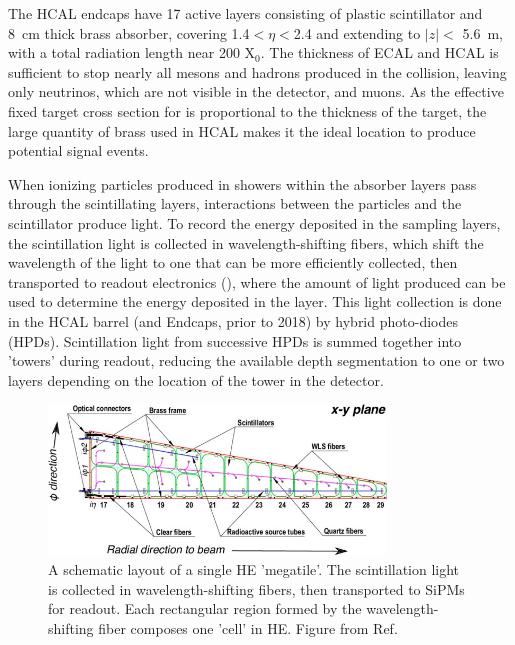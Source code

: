 The HCAL endcaps have 17 active layers consisting of plastic scintillator and \SI{8}{\centi\meter} thick brass absorber, covering 1.4$<\eta<$2.4 and extending to $\lvert z \rvert<$ \SI{5.6}{\meter}, with a total radiation length near 200 X$_0$. 
The thickness of ECAL and HCAL is sufficient to stop nearly all mesons and hadrons produced in the collision, leaving only neutrinos, which are not visible in the detector, and muons. 
As the effective fixed target cross section for \dbrem is proportional to the thickness of the target, the large quantity of brass used in HCAL makes it the ideal location to produce potential signal events.

When ionizing particles produced in showers within the absorber layers pass through the scintillating layers, interactions between the particles and the scintillator produce light.
To record the energy deposited in the sampling layers, the scintillation light is collected in wavelength-shifting fibers, which shift the wavelength of the light to one that can be more efficiently collected, then transported to readout electronics (), where the amount of light produced can be used to determine the energy deposited in the layer.
This light collection is done in the HCAL barrel (and Endcaps, prior to 2018) by hybrid photo-diodes (HPDs). 
Scintillation light from successive HPDs is summed together into 'towers' during readout, reducing the available depth segmentation to one or two layers depending on the location of the tower in the detector.

\begin{figure}[!htpb]
	   \centering
	      \includegraphics[width=0.8\textwidth]{figures/megatile.jpg}
		 \caption[An HCAL Tile]{A schematic layout of a single HE 'megatile'. The scintillation light is collected in wavelength-shifting fibers, then transported to SiPMs for readout. Each rectangular region formed by the wavelength-shifting fiber composes one 'cell' in HE. Figure from Ref.\cite{sipmRadDam}}
	    \label{fig:megatile}
\end{figure}

